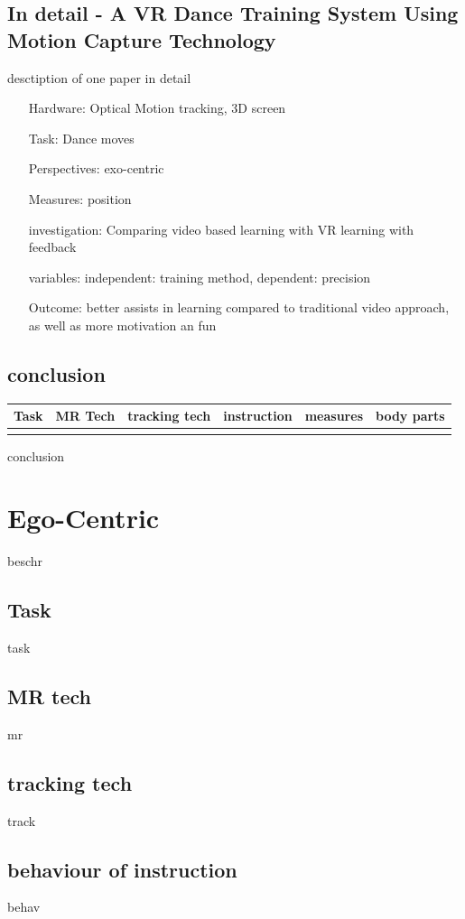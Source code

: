 \subsection{In detail - A VR Dance Training System Using Motion Capture Technology}
desctiption of one paper in detail
\begin{itemize}
	\item[Hardware:] Optical Motion tracking, 3D screen
	\item[Task:] Dance moves
	\item[Perspectives:] exo-centric
	\item[Measures:] position
	\item[investigation:] Comparing video based learning with VR learning with feedback
	\item[variables:] independent: training method, dependent: precision
	\item[Outcome:] better assists in learning compared to traditional video approach, as well as more motivation an fun
\end{itemize}
\subsection{conclusion}
\begin{table}[]
	\begin{tabular}{|l|l|l|l|l|l|}
		\hline
		Task & MR Tech & tracking tech & instruction & measures & body parts  \\ \hline
		&  &  &  &  &  \\ \hline
	\end{tabular}
\end{table}
conclusion



\section{Ego-Centric}
beschr
\subsection{Task}
task
\subsection{MR tech}
mr
\subsection{tracking tech}
track
\subsection{behaviour of instruction}
behav
